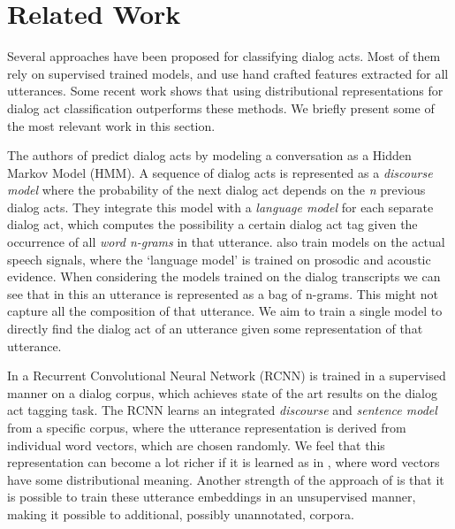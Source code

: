 \section{Related Work}\label{sec:relwork}
Several approaches have been proposed for classifying dialog acts. Most of them rely on supervised trained models, and use hand crafted features extracted for all utterances. Some recent work shows that using distributional representations for dialog act classification outperforms these methods. We briefly present some of the most relevant work in this section.

The authors of  predict dialog acts by modeling a conversation as a Hidden Markov Model (HMM). A sequence of dialog acts is represented as a \emph{discourse model} where the probability of the next dialog act depends on the \emph{n} previous dialog acts. They integrate this model with a \emph{language model} for each separate dialog act, which computes the possibility a certain dialog act tag given the occurrence of all \emph{word n-grams} in that utterance.  also train models on the actual speech signals, where the `language model' is trained on prosodic and acoustic evidence. When considering the models trained on the dialog transcripts we can see that in this an utterance is represented as a bag of n-grams. This might not capture all the composition of that utterance. We aim to train a single model to directly find the dialog act of an utterance given some representation of that utterance.

In  a Recurrent Convolutional Neural Network (RCNN) is trained in a supervised manner on a dialog corpus, which achieves state of the art results on the dialog act tagging task. The RCNN learns an integrated \emph{discourse} and \emph{sentence model} from a specific corpus, where the utterance representation is derived from individual word vectors, which are chosen randomly. We feel that this representation can become a lot richer if it is learned as in , where word vectors have some distributional meaning. Another strength of the approach of  is that it is possible to train these utterance embeddings in an unsupervised manner, making it possible to additional, possibly unannotated, corpora. 

